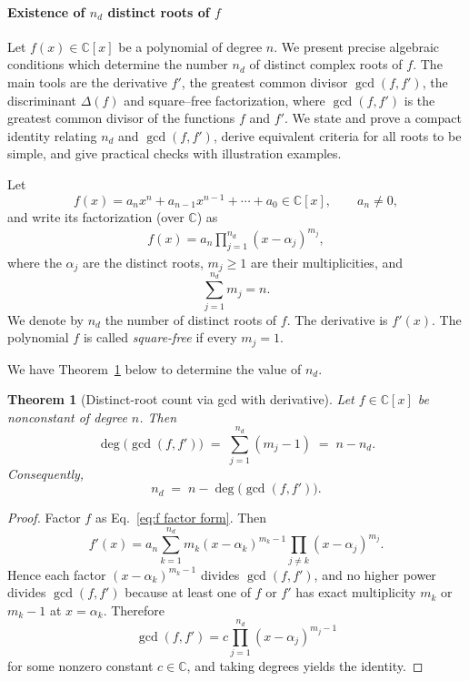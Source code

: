 \documentclass[11pt]{article}
\newtheorem{theorem}{Theorem}
\begin{document}
\paragraph{Existence of $n_d$ distinct roots of $f$}

Let \(f(x)\in\mathbb{C}[x]\) be a polynomial of degree \(n\).  We present precise algebraic conditions which determine the number \(n_d\) of distinct complex roots of \(f\).  The main tools are the derivative \(f'\), the greatest common divisor \(\gcd(f,f')\), the discriminant \(\Delta(f)\) and square--free factorization, where $\gcd(f,f')$ is the greatest common divisor of the functions $f$ and $f'$. We state and prove a compact identity relating \(n_d\) and \(\gcd(f,f')\), derive equivalent criteria for all roots to be simple, and give practical checks with illustration examples. 


Let
\[
f(x)=a_n x^n+a_{n-1}x^{n-1}+\cdots+a_0\in\mathbb{C}[x],\qquad a_n\neq0,
\]
and write its factorization (over \(\mathbb{C}\)) as
%
\begin{eqnarray}\label{eq:f factor form}
f(x)=a_n\prod_{j=1}^{n_d}(x-\alpha_j)^{m_j},
\end{eqnarray}
%
where the \(\alpha_j\) are the distinct roots, \(m_j\ge1\) are their multiplicities, and
\[
\sum_{j=1}^{n_d} m_j = n.
\]
We denote by \(n_d\) the number of distinct roots of \(f\).  The derivative is \(f'(x)\).  The polynomial \(f\) is called \emph{square-free} if every \(m_j=1\). 

We have Theorem~\ref{thm:gcd}  below to determine the value of $n_d$.

\begin{theorem}[Distinct-root count via gcd with derivative]\label{thm:gcd}
%
Let \(f\in\mathbb{C}[x]\) be nonconstant of degree \(n\).  Then
\[
\deg\big(\gcd(f,f')\big)\;=\;\sum_{j=1}^{n_d}(m_j-1)\;=\;n-n_d.
\]
Consequently,
\[
n_d \;=\; n - \deg\big(\gcd(f,f')\big).
\]
\end{theorem}

\begin{proof}

%
Factor \(f\) as Eq.~\eqref{eq:f factor form}.  Then
\[
f'(x)=a_n\sum_{k=1}^{n_d} m_k (x-\alpha_k)^{m_k-1}\prod_{j\neq k}(x-\alpha_j)^{m_j}.
\]
Hence each factor \((x-\alpha_k)^{m_k-1}\) divides \(\gcd(f,f')\), and no higher power divides \(\gcd(f,f')\) because at least one of \(f\) or \(f'\) has exact multiplicity \(m_k\) or \(m_k-1\) at \(x=\alpha_k\).  Therefore
\[
\gcd(f,f')=c\prod_{j=1}^{n_d} (x-\alpha_j)^{m_j-1}
\]
for some nonzero constant \(c\in\mathbb{C}\), and taking degrees yields the identity.
%
\end{proof}
\end{document}

